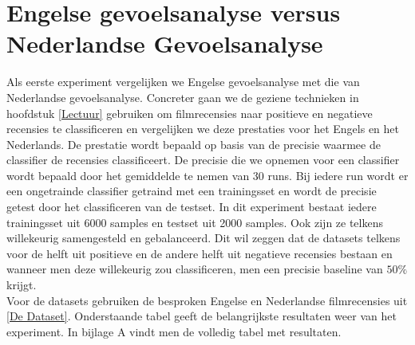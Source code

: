 \section{Engelse gevoelsanalyse versus Nederlandse Gevoelsanalyse}\label{Engelse gevoelsanalyse versus Nederlandse Gevoelsanalyse}
Als eerste experiment vergelijken we Engelse gevoelsanalyse met die van Nederlandse gevoelsanalyse. Concreter gaan we de geziene technieken in  hoofdstuk \ref{Lectuur} gebruiken om filmrecensies naar positieve en negatieve recensies te classificeren en vergelijken we deze prestaties voor het Engels en het Nederlands. De prestatie wordt bepaald op basis van de precisie waarmee de classifier de recensies classificeert. De precisie die we opnemen voor een classifier wordt bepaald door het gemiddelde te nemen van 30 runs. Bij iedere run wordt er een ongetrainde classifier getraind met een trainingsset en wordt de precisie getest door het classificeren van de testset. In dit experiment bestaat iedere trainingsset uit 6000 samples en testset uit 2000 samples. Ook zijn ze telkens willekeurig samengesteld en gebalanceerd. Dit wil zeggen dat de datasets telkens voor de helft uit positieve en de andere helft uit negatieve recensies bestaan en wanneer men deze willekeurig zou classificeren, men een precisie baseline van $50\%$ krijgt.\\

Voor de datasets gebruiken de besproken Engelse en Nederlandse filmrecensies uit \ref{De Dataset}.  
Onderstaande tabel geeft de belangrijkste resultaten weer van het experiment. In bijlage A vindt men de volledig tabel met resultaten.\\

